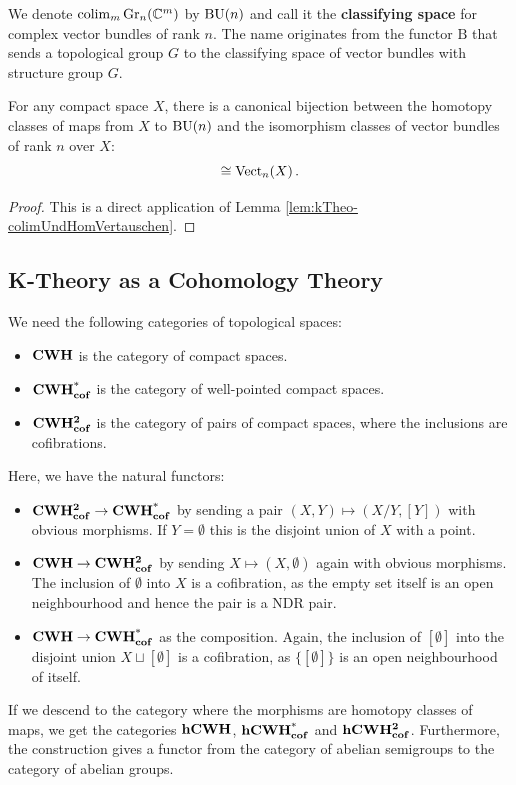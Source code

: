  \begin{definition}
	We denote $\operatorname{\mathrm{colim}}_m \operatorname{\mathrm{Gr}}_n(\mathbb{C}^m)$ by $\mathrm{BU}(n)$ and call it the \textbf{classifying space} for complex vector bundles of rank $n$. The name originates from the functor $\mathrm{B}$ that sends a topological group $G$ to the classifying space of vector bundles with structure group $G$. 
 \end{definition}
 \begin{corollary} \label{cor:kTheo-classifyingSpaceVectorBundles}
	For any compact space $X$, there is a canonical bijection between the homotopy classes of maps from $X$ to $\mathrm{BU}(n)$ and the isomorphism classes of vector bundles of rank $n$ over $X$:
	\begin{equation*}
		[X,\BU(n)] \cong \Vect_n(X)\,.
	\end{equation*}
 \end{corollary}
 \begin{proof}
	This is a direct application of Lemma \ref{lem:kTheo-colimUndHomVertauschen}.
 \end{proof}
 \subsection{K-Theory as a Cohomology Theory}
 \begin{definition}\label{def:kTheo-SetupOfThePairAndPointedSpaces}
	We need the following categories of topological spaces:
	\begin{itemize}
		\item $\operatorname{\mathbf{CWH}}$ is the category of compact spaces.
		\item $\operatorname{\mathbf{CWH^*_{cof}}}$ is the category of well-pointed compact spaces.
		\item $\operatorname{\mathbf{CWH^{2}_{cof}}}$ is the category of pairs of compact spaces, where the inclusions are cofibrations.
	\end{itemize}
	Here, we have the natural functors:
	\begin{itemize}
		\item $\operatorname{\mathbf{CWH^{2}_{cof}}} \to \operatorname{\mathbf{CWH^*_{cof}}}$ by sending a pair $(X,Y)\mapsto (X/Y,[Y])$ with obvious morphisms. If $Y=\emptyset$ this is the disjoint union of $X$ with a point.
		\item $\operatorname{\mathbf{CWH}} \to \operatorname{\mathbf{CWH^{2}_{cof}}}$ by sending $X\mapsto (X,\emptyset)$ again with obvious morphisms. The inclusion of $\emptyset$ into $X$ is a cofibration, as the empty set itself is an open neighbourhood and hence the pair is a NDR pair.
		\item $\operatorname{\mathbf{CWH}} \to \operatorname{\mathbf{CWH^*_{cof}}}$ as the composition. Again, the inclusion of $[\emptyset]$ into the disjoint union $X \sqcup [\emptyset]$ is a cofibration, as $\{[\emptyset]\}$ is an open neighbourhood of itself.
	\end{itemize}
	If we descend to the category where the morphisms are homotopy classes of maps, we get the categories $\operatorname{\mathbf{hCWH}}$, $\operatorname{\mathbf{hCWH^{*}_{cof}}}$ and $\operatorname{\mathbf{hCWH^{2}_{cof}}}$. Furthermore, the construction gives a functor from the category of abelian semigroups to the category of abelian groups. 
\end{definition}

